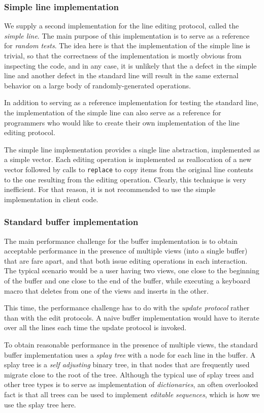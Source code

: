 \subsubsection{Simple line implementation}

We supply a second implementation for the line editing protocol,
called the \emph{simple line}.  The main purpose of this
implementation is to serve as a reference for \emph{random tests}.
The idea here is that the implementation of the simple line is
trivial, so that the correctness of the implementation is mostly
obvious from inspecting the code, and in any case, it is unlikely that
the a defect in the simple line and another defect in the standard
line will result in the same external behavior on a large body of
randomly-generated operations.

In addition to serving as a reference implementation for testing the
standard line, the implementation of the simple line can also serve as
a reference for programmers who would like to create their own
implementation of the line editing protocol.

The simple line implementation provides a single line abstraction,
implemented as a \commonlisp{} simple vector.  Each editing operation
is implemented as reallocation of a new vector followed by calls to
\texttt{replace} to copy items from the original line contents to the
one resulting from the editing operation.  Clearly, this technique is
very inefficient.  For that reason, it is not recommended to use the
simple implementation in client code.

\subsubsection{Standard buffer implementation}

The main performance challenge for the buffer implementation is to
obtain acceptable performance in the presence of multiple views (into
a single buffer) that are fare apart, and that both issue editing
operations in each interaction.  The typical scenario would be a user
having two views, one close to the beginning of the buffer and one
close to the end of the buffer, while executing a keyboard macro that
deletes from one of the views and inserts in the other.

This time, the performance challenge has to do with the \emph{update
  protocol} rather than with the edit protocols.  A naive buffer
implementation would have to iterate over all the lines each time the
update protocol is invoked.

To obtain reasonable performance in the presence of multiple views,
the standard buffer implementation uses a \emph{splay tree}
\cite{Sleator:1985:SBS:3828.3835} with a node for each line in the
buffer.  A splay tree is a \emph{self adjusting} binary tree, in that
nodes that are frequently used migrate close to the root of the tree.
Although the typical use of splay trees and other tree types is to
serve as implementation of \emph{dictionaries}, an often overlooked
fact is that all trees can be used to implement \emph{editable
  sequences}, which is how we use the splay tree here.
